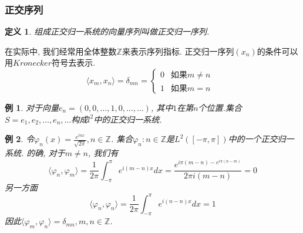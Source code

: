 \documentclass{book}
\newtheorem{definition}{\hspace{2em}定义}[section]
\newtheorem{example}{例}[section]
\begin{document}
\subsubsection*{正交序列}
\begin{definition}
  组成正交归一系统的向量序列叫做正交归一序列.
\end{definition}
在实际中, 我们经常用全体整数$\mathbb{Z}$来表示序列指标. 正交归一序列$(x_n)$的条件可以用$Kronecker$符号去表示.
\begin{equation*}
  \langle x_m,x_n\rangle=\delta_{mn}=\begin{cases}
                                       0 & \text{如果$m\neq n$ }\\
                                       1 & \text{如果$m=n$}
                                     \end{cases}
\end{equation*}
\begin{example}
  对于向量$e_n=(0,0,\dots,1,0,\dots,\dots)$, 其中$1$在第$n$个位置.集合$S={e_1,e_2,\dots,e_n,\dots}$构成$l^2$中的正交归一系统.
\end{example}
\begin{example}
  令$\varphi_n(x)=\frac{e^{inx}}{\sqrt{2\pi}},n\in \mathbb{Z}$. 集合${\varphi_n:n\in\mathbb{Z}}$是$L^2([-\pi,\pi])$中的一个正交归一系统. 的确, 对于$m\neq n$, 我们有
  \begin{equation*}
    \langle\varphi_n,\varphi_m\rangle=\frac{1}{2\pi}\int_{-\pi}^{\pi}e^{i(m-n)x}dx=\frac{e^{i\pi(m-n)-e^{i\pi(n-m)}}}{2\pi i(m-n)}=0
  \end{equation*}
  另一方面
  \begin{equation*}
    \langle\varphi_n,\varphi_n\rangle=\frac{1}{2\pi}\int_{-\pi}^{\pi}e^{i(n-n)x}dx=1
  \end{equation*}
  因此$\langle\varphi_m,\varphi_n\rangle=\delta_{mn},m,n\in\mathbb{Z}$.
\end{example}
\end{document}

